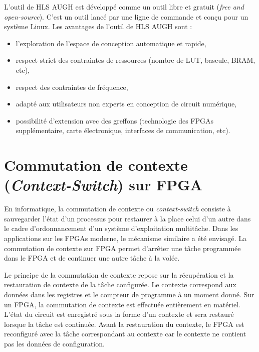 L'outil de HLS AUGH est développé comme un outil libre et gratuit (\emph{free and open-source}).
C'est un outil lancé par une ligne de commande et conçu pour un système Linux. 
Les avantages de l'outil de HLS AUGH sont :
\begin{itemize}
	\item
	
	l'exploration de l'espace de conception automatique et rapide,
	
	\item
	
	respect strict des contraintes de ressources (nombre de LUT, bascule, BRAM, etc),
	
	\item 
	
	respect des contraintes de fréquence,
	
	\item 
	
	adapté aux utilisateurs non experts en conception de circuit numérique,
	
	\item
	
	possibilité d'extension avec des greffons (technologie des FPGAs supplémentaire, carte électronique, interfaces de communication, etc).

\end{itemize}

\section{Commutation de contexte (\emph{Context-Switch}) sur FPGA}
\label{sec:contextswitch}
En informatique, la commutation de contexte ou \emph{context-switch} 
consiste à sauvegarder l'état d'un processus pour restaurer à la place celui d'un autre
dans le cadre d'ordonnancement d'un système d'exploitation multitâche.
Dans les applications sur les FPGAs moderne, le mécanisme similaire a été envisagé. La commutation de contexte sur FPGA
permet d'arrêter une tâche programmée dans le FPGA et de continuer une autre tâche à la volée.

Le principe de la commutation de contexte repose sur la récupération et la restauration de contexte de la tâche configurée. 
Le contexte correspond aux données dans les registres et le compteur de programme à un moment donné.
Sur un FPGA, la commutation de contexte est effectuée entièrement en matériel. L'état du circuit est enregistré
sous la forme d'un contexte et sera restauré lorsque la tâche est continuée. 
Avant la restauration du contexte, le FPGA est reconfiguré avec la tâche correspondant au contexte car le contexte
ne contient pas les données de configuration.

